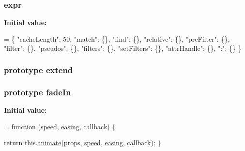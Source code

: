 \subsubsection[{\texorpdfstring{expr}{expr}}]{ expr}\hypertarget{jquery-2_82_81-vsdoc_8js_aaacd1d5b3593ba4dfff6d67d4f6cfda1}{}\label{jquery-2_82_81-vsdoc_8js_aaacd1d5b3593ba4dfff6d67d4f6cfda1}
{\bfseries Initial value\+:}
\begin{DoxyCode}
= \{
        \textcolor{stringliteral}{"cacheLength"}: 50,
        \textcolor{stringliteral}{"match"}: \{\},
        \textcolor{stringliteral}{"find"}: \{\},
        \textcolor{stringliteral}{"relative"}: \{\},
        \textcolor{stringliteral}{"preFilter"}: \{\},
        \textcolor{stringliteral}{"filter"}: \{\},
        \textcolor{stringliteral}{"pseudos"}: \{\},
        \textcolor{stringliteral}{"filters"}: \{\},
        \textcolor{stringliteral}{"setFilters"}: \{\},
        \textcolor{stringliteral}{"attrHandle"}: \{\},
        \textcolor{stringliteral}{":"}: \{\}
    \}
\end{DoxyCode}
\subsubsection[{\texorpdfstring{extend}{extend}}]{ {\bf prototype} extend}\hypertarget{jquery-2_82_81-vsdoc_8js_a8b82339bea13558e50bdb325aa684d64}{}\label{jquery-2_82_81-vsdoc_8js_a8b82339bea13558e50bdb325aa684d64}
\subsubsection[{\texorpdfstring{fade\+In}{fadeIn}}]{ {\bf prototype} fade\+In}\hypertarget{jquery-2_82_81-vsdoc_8js_afd244940d1c307d34714250fc16cc7e8}{}\label{jquery-2_82_81-vsdoc_8js_afd244940d1c307d34714250fc16cc7e8}
{\bfseries Initial value\+:}
\begin{DoxyCode}
= \textcolor{keyword}{function} (\hyperlink{jquery-2_82_81-vsdoc_8js_add98c90065e6563cba26ff6d2016c46c}{speed}, \hyperlink{jquery-2_82_81-vsdoc_8js_a9758a312629fa6de1744280dd6e6253b}{easing}, callback) \{
        

        \textcolor{keywordflow}{return} this.\hyperlink{jquery-2_82_81-vsdoc_8js_a956a1d08128d41115c45b6815814a64d}{animate}(props, \hyperlink{jquery-2_82_81-vsdoc_8js_add98c90065e6563cba26ff6d2016c46c}{speed}, \hyperlink{jquery-2_82_81-vsdoc_8js_a9758a312629fa6de1744280dd6e6253b}{easing}, callback);
    \}
\end{DoxyCode}
